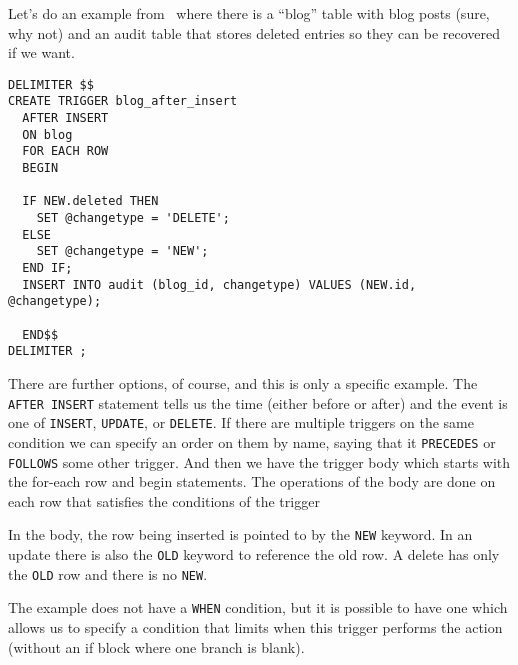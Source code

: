 Let's do an example from~\cite{trigger} where there is a ``blog'' table with blog posts (sure, why not) and an audit table that stores deleted entries so they can be recovered if we want.

{\small
\begin{verbatim}
DELIMITER $$
CREATE TRIGGER blog_after_insert 
  AFTER INSERT 
  ON blog
  FOR EACH ROW 
  BEGIN
  
  IF NEW.deleted THEN
    SET @changetype = 'DELETE';
  ELSE
    SET @changetype = 'NEW';
  END IF;  
  INSERT INTO audit (blog_id, changetype) VALUES (NEW.id, @changetype);
		
  END$$
DELIMITER ;
\end{verbatim}
}

There are further options, of course, and this is only a specific example. The \texttt{AFTER INSERT} statement tells us the time (either before or after) and the event is one of \texttt{INSERT}, \texttt{UPDATE}, or \texttt{DELETE}. If there are multiple triggers on the same condition we can specify an order on them by name, saying that it \texttt{PRECEDES} or \texttt{FOLLOWS} some other trigger. And then we have the trigger body which starts with the for-each row and begin statements. The operations of the body are done on each row that satisfies the conditions of the trigger

In the body, the row being inserted is pointed to by the \texttt{NEW} keyword. In an update there is also the \texttt{OLD} keyword to reference the old row. A delete has only the \texttt{OLD} row and there is no \texttt{NEW}.

The example does not have a \texttt{WHEN} condition, but it is possible to have one which allows us to specify a condition that limits when this trigger performs the action (without an if block where one branch is blank). 





